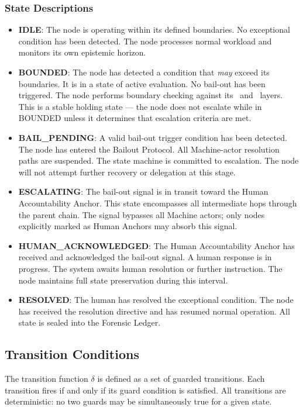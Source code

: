 \subsubsection{State Descriptions}

\begin{itemize}
  \item \textbf{IDLE}: The node is operating within its defined boundaries. No exceptional condition has been detected. The node processes normal workload and monitors its own epistemic horizon.
  \item \textbf{BOUNDED}: The node has detected a condition that \emph{may} exceed its boundaries. It is in a state of active evaluation. No bail-out has been triggered. The node performs boundary checking against its \purpose\ and \bounds\ layers. This is a stable holding state --- the node does not escalate while in BOUNDED unless it determines that escalation criteria are met.
  \item \textbf{BAIL\_PENDING}: A valid bail-out trigger condition has been detected. The node has entered the Bailout Protocol. All Machine-actor resolution paths are suspended. The state machine is committed to escalation. The node will not attempt further recovery or delegation at this stage.
  \item \textbf{ESCALATING}: The bail-out signal is in transit toward the Human Accountability Anchor. This state encompasses all intermediate hops through the parent chain. The signal bypasses all Machine actors; only nodes explicitly marked as Human Anchors may absorb this signal.
  \item \textbf{HUMAN\_ACKNOWLEDGED}: The Human Accountability Anchor has received and acknowledged the bail-out signal. A human response is in progress. The system awaits human resolution or further instruction. The node maintains full state preservation during this interval.
  \item \textbf{RESOLVED}: The human has resolved the exceptional condition. The node has received the resolution directive and has resumed normal operation. All state is sealed into the Forensic Ledger.
\end{itemize}

\subsection{Transition Conditions}

The transition function $\delta$ is defined as a set of guarded transitions. Each transition fires if and only if its guard condition is satisfied. All transitions are deterministic: no two guards may be simultaneously true for a given state.


